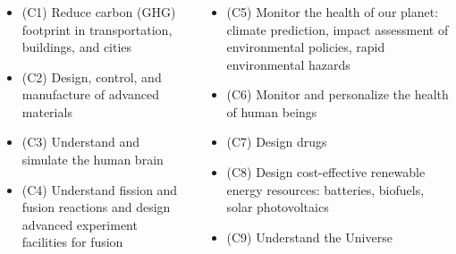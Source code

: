 \begin{frame}
  \frametitle{\insertsectionhead}
  \framesubtitle{\insertsubsectionhead}
  \footnotesize
  \begin{columns}
    \begin{itemize}
      \item (C1) Reduce carbon (GHG) footprint in transportation, buildings, and cities
       \item (C2) Design, control, and manufacture of advanced materials
       \item (C3) Understand and simulate the human brain
       \item (C4) Understand fission and fusion reactions and design advanced experiment facilities for fusion
             \end{itemize} 
    \begin{itemize}
      \item (C5) Monitor the health of our planet: climate prediction, impact assessment of environmental policies, rapid environmental hazards

        \item (C6) Monitor and personalize the health of human beings 
       \item (C7) Design drugs
       \item (C8) Design cost-effective renewable energy resources: batteries, biofuels, solar photovoltaics
       \item (C9) Understand the Universe
     \end{itemize} 
  \end{columns}

\end{frame}

